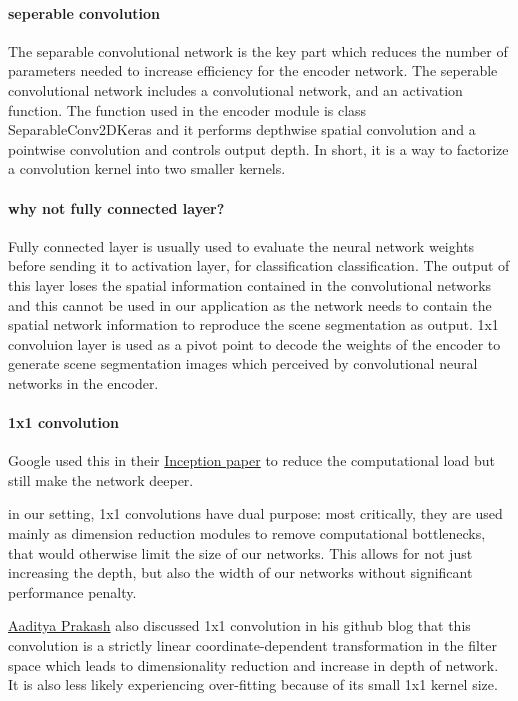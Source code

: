 \documentclass[paper=a4, fontsize=11pt]{scrartcl} %
\numberwithin{equation}{section} %
\numberwithin{figure}{section} %
\numberwithin{table}{section} %
\begin{document}
\paragraph{seperable convolution} The separable convolutional network is the key part which reduces the number of parameters needed to increase efficiency for the encoder network. The seperable convolutional network includes a convolutional network, and an activation function.
The function used in the encoder module is class SeparableConv2DKeras and it performs depthwise spatial convolution and a pointwise convolution and controls output depth. In short, it is a way to factorize a convolution kernel into two smaller kernels.

\paragraph{why not fully connected layer?}\label{rubric31} Fully connected layer is usually used to evaluate the neural network weights before sending it to activation layer, for classification classification. The output of this layer loses the spatial information contained in the convolutional networks and this cannot be used in our application as the network needs to contain the spatial network information to reproduce the scene segmentation as output. 1x1 convoluion layer is used as a pivot point to decode the weights of the encoder to generate scene segmentation images which perceived by convolutional neural networks in the encoder.

\paragraph{1x1 convolution}\label{rubric30} Google used this in their \href{https://arxiv.org/abs/1409.4842}{Inception paper} to reduce the computational load but still make the network deeper.

\begin{displayquote}
	in our setting, 1x1 convolutions have dual purpose: most critically, they are used mainly as dimension reduction modules to remove computational bottlenecks, that would otherwise limit the size of our networks. This allows for not just increasing the depth, but also the width of our networks without significant performance penalty.
\end{displayquote}

\href{https://iamaaditya.github.io/2016/03/one-by-one-convolution/}{Aaditya Prakash} also discussed 1x1 convolution in his github blog that this convolution is a strictly linear coordinate-dependent transformation in the filter space which leads to dimensionality reduction and increase in depth of network. It is also less likely experiencing over-fitting because of its small 1x1 kernel size. 
\end{document}
